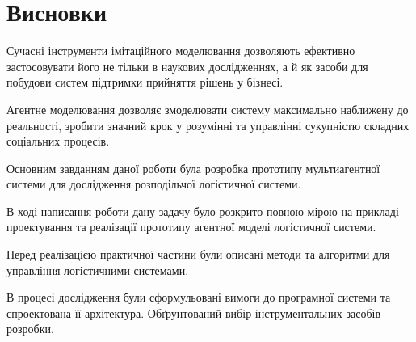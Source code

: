 \section*{Висновки}
Сучасні інструменти імітаційного моделювання дозволяють ефективно застосовувати його
не тільки в наукових дослідженнях, а й як засоби для побудови систем підтримки прийняття рішень у бізнесі. 

Агентне моделювання дозволяє змоделювати систему максимально наближену до реальності, зробити значний крок у розумінні та управлінні сукупністю складних соціальних процесів.

Основним завданням даної роботи була розробка прототипу мультиагентної системи для дослідження розподільчої логістичної системи.

В ході написання роботи дану задачу було розкрито повною мірою на прикладі проектування та реалізації прототипу агентної моделі логістичної системи.

Перед реалізацією практичної частини були описані методи та алгоритми для управління логістичними системами. 

В процесі дослідження були сформульовані вимоги до програмної системи та спроектована її архітектура. 
Обґрунтований вибір інструментальних засобів розробки.
